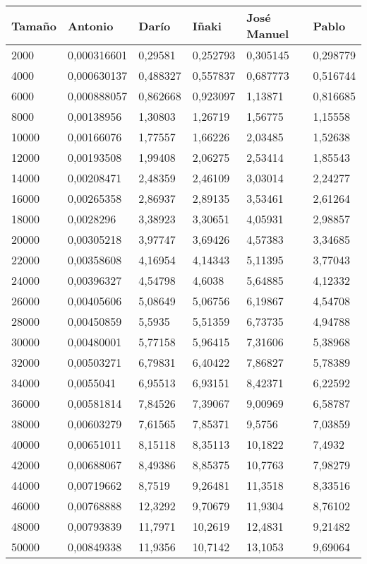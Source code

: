 \begin{tabular}{|l|l|l|l|l|l|}
	\hline
	Tamaño & Antonio & Darío & Iñaki & José Manuel & Pablo \\
	\hline
	\hline
	2000 & 0,000316601 & 0,29581 & 0,252793 & 0,305145 & 0,298779 \\
	\hline
	4000 & 0,000630137 & 0,488327 & 0,557837 & 0,687773 & 0,516744 \\
	\hline
	6000 & 0,000888057 & 0,862668 & 0,923097 & 1,13871 & 0,816685 \\
	\hline
	8000 & 0,00138956 & 1,30803 & 1,26719 & 1,56775 & 1,15558 \\
	\hline
	10000 & 0,00166076 & 1,77557 & 1,66226 & 2,03485 & 1,52638 \\
	\hline
	12000 & 0,00193508 & 1,99408 & 2,06275 & 2,53414 & 1,85543 \\
	\hline
	14000 & 0,00208471 & 2,48359 & 2,46109 & 3,03014 & 2,24277 \\
	\hline
	16000 & 0,00265358 & 2,86937 & 2,89135 & 3,53461 & 2,61264 \\
	\hline
	18000 & 0,0028296 & 3,38923 & 3,30651 & 4,05931 & 2,98857 \\
	\hline
	20000 & 0,00305218 & 3,97747 & 3,69426 & 4,57383 & 3,34685 \\
	\hline
	22000 & 0,00358608 & 4,16954 & 4,14343 & 5,11395 & 3,77043 \\
	\hline
	24000 & 0,00396327 & 4,54798 & 4,6038 & 5,64885 & 4,12332 \\
	\hline
	26000 & 0,00405606 & 5,08649 & 5,06756 & 6,19867 & 4,54708 \\
	\hline
	28000 & 0,00450859 & 5,5935 & 5,51359 & 6,73735 & 4,94788 \\
	\hline
	30000 & 0,00480001 & 5,77158 & 5,96415 & 7,31606 & 5,38968 \\
	\hline
	32000 & 0,00503271 & 6,79831 & 6,40422 & 7,86827 & 5,78389 \\
	\hline
	34000 & 0,0055041 & 6,95513 & 6,93151 & 8,42371 & 6,22592 \\
	\hline
	36000 & 0,00581814 & 7,84526 & 7,39067 & 9,00969 & 6,58787 \\
	\hline
	38000 & 0,00603279 & 7,61565 & 7,85371 & 9,5756 & 7,03859 \\
	\hline
	40000 & 0,00651011 & 8,15118 & 8,35113 & 10,1822 & 7,4932 \\
	\hline
	42000 & 0,00688067 & 8,49386 & 8,85375 & 10,7763 & 7,98279 \\
	\hline
	44000 & 0,00719662 & 8,7519 & 9,26481 & 11,3518 & 8,33516 \\
	\hline
	46000 & 0,00768888 & 12,3292 & 9,70679 & 11,9304 & 8,76102 \\
	\hline
	48000 & 0,00793839 & 11,7971 & 10,2619 & 12,4831 & 9,21482 \\
	\hline
	50000 & 0,00849338 & 11,9356 & 10,7142 & 13,1053 & 9,69064 \\
	\hline
\end{tabular}
